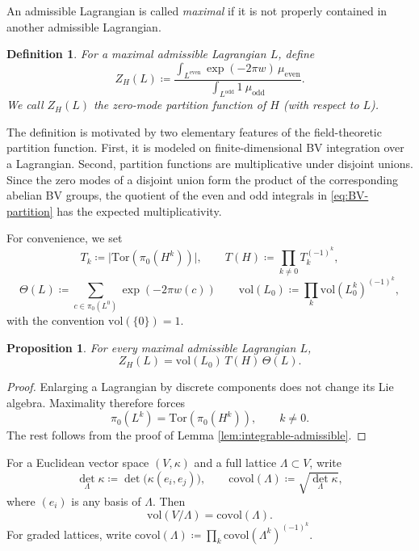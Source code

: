 \documentclass[10pt,a4paper]{amsart}
\numberwithin{table}{section}
\numberwithin{equation}{section}
\newtheorem{defn}{Definition}[section]
\newtheorem{prop}{Proposition}[section]
\newcommand{\Tor}{\mathrm{Tor}}
\newcommand{\vol}{\mathrm{vol}}
\newcommand{\covol}{\mathrm{covol}}
\begin{document}
An admissible Lagrangian is called  \emph{maximal} if it is not properly contained in another admissible Lagrangian.

\begin{defn}
For a maximal admissible Lagrangian $L$, define
\begin{equation}\label{eq:BV-partition}
Z_H(L)\coloneq
\frac{\displaystyle\int_{L^{\mathrm{even}}}\exp(- 2\pi w)\,\mu_{\mathrm{even}}}
{\displaystyle\int_{L^{\mathrm{odd}}}1\ \mu_{\mathrm{odd}}}.
\end{equation}
We call $Z_H(L)$ the \emph{zero-mode partition function} of $H$ (with respect to $L$).
\end{defn}

The definition is motivated by two elementary features of the field-theoretic partition function. First, it is modeled on finite-dimensional BV integration over a Lagrangian. Second, partition functions are multiplicative under disjoint unions. Since the zero modes of a disjoint union form the product of the corresponding abelian BV groups, the quotient of the even and odd integrals in \eqref{eq:BV-partition} has the expected multiplicativity. 

For convenience, we set
\[
T_k\coloneq\bigl|\Tor (\pi_0(H^k))\bigr|,
\qquad
T(H)\coloneq\prod_{k\ne0}T_k^{(-1)^k},
\]
\[
\Theta(L)\coloneq\sum_{c\in\pi_0(L^0)}\exp(-2 \pi w(c))
\qquad
\vol(L_0)\coloneq\prod_k \vol(L_0^k)^{(-1)^k},
\]
with the convention $\vol(\{0\})=1$.

\begin{prop}\label{prop:partition-factorization}
For every maximal admissible Lagrangian $L$,
\begin{equation}\label{eq:partition-factorization}
Z_H(L)=\vol(L_0)\, T(H)\, \Theta(L).
\end{equation}
\end{prop}

\begin{proof}
Enlarging a Lagrangian by discrete components does not change its Lie algebra. Maximality therefore forces
\[
\pi_0(L^k)=
\Tor(\pi_0(H^k)), \qquad k\ne0.
\]
The rest follows from the proof of Lemma \ref{lem:integrable-admissible}.
\end{proof}

For a Euclidean vector space $(V,\kappa)$ and a full lattice $\Lambda\subset V$, write
\[
{\det}_\Lambda \kappa\coloneq\det\bigl(\kappa(e_i,e_j)\bigr),
\qquad
\covol(\Lambda)\coloneq\sqrt{{\det}_\Lambda \kappa},
\]
where $(e_i)$ is any basis of $\Lambda$. Then
\[
\vol(V/\Lambda) = \covol(\Lambda).
\]
For graded lattices, write $\covol(\Lambda)\coloneqq\prod_k\covol(\Lambda^k)^{(-1)^k}$.
\end{document}
